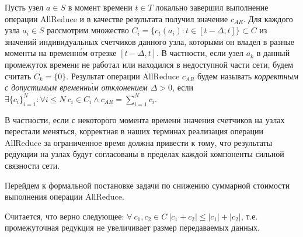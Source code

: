 \begin{definition}
\label{AllReduceСorrectness}
    Пусть узел $a \in S$ в момент времени $t \in T$ локально завершил выполнение операции AllReduce и в качестве результата получил значение $c_{AR}$. Для каждого узла $a_i \in S$ рассмотрим множество $C_i = \{ c_t(a_i) \colon t \in [t - \Delta, t] \} \subset C$ из значений индивидуальных счетчиков данного узла, которыми он владел в разные моменты на временн\'{о}м отрезке $[t - \Delta, t]$. В частности, если узел $a_k$ в данный промежуток времени не работал или находился в недоступной части сети, будем считать $C_k = \{ 0 \}$. Результат операции AllReduce $c_{AR}$ будем называть \textit{корректным с допустимым временн\'{ы}м отклонением $\Delta > 0$}, если $\exists \{ c_i \}_{i = 1}^N \colon \forall i \leq N\ c_i \in C_i \wedge c_{AR} = \displaystyle \sum_{i = 1}^N c_i$.
\end{definition}

\begin{remark}
    В частности, если с некоторого момента времени значения счетчиков на узлах перестали меняться, корректная в наших терминах реализация операции AllReduce за ограниченное время должна привести к тому, что результаты редукции на узлах будут согласованы в пределах каждой компоненты сильной связности сети.
\end{remark}

Перейдем к формальной постановке задачи по снижению суммарной стоимости выполнения операции AllReduce.

\begin{remark}
\label{ReductionOptimization}
    Считается, что верно следующее: $\forall\ c_1, c_2 \in C\ |c_1 + c_2| \leq |c_1| + |c_2|$, т.е. промежуточная редукция не увеличивает размер передаваемых данных.
\end{remark}

